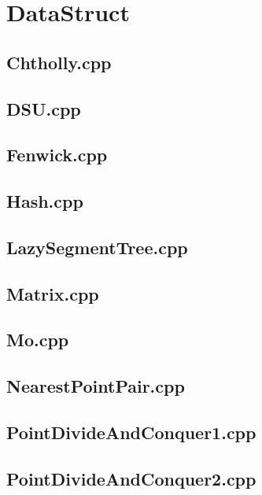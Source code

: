 \section{DataStruct}
\subsection{Chtholly.cpp}

\subsection{DSU.cpp}

\subsection{Fenwick.cpp}

\subsection{Hash.cpp}

\subsection{LazySegmentTree.cpp}

\subsection{Matrix.cpp}

\subsection{Mo.cpp}

\subsection{NearestPointPair.cpp}

\subsection{PointDivideAndConquer1.cpp}

\subsection{PointDivideAndConquer2.cpp}

